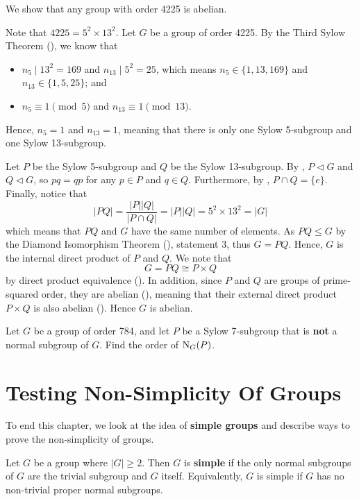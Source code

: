 \begin{example}
    We show that any group with order 4225 is abelian.

    Note that $4225 = 5^2 \times 13^2$. Let $G$ be a group of order 4225. By the Third Sylow Theorem (), we know that
    \begin{itemize}
        \item $n_5 \mid 13^2 = 169$ and $n_{13} \mid 5^2 = 25$, which means $n_5 \in \{1, 13, 169\}$ and $n_{13} \in \{1, 5, 25\}$; and
        \item $n_5 \equiv 1 \pmod 5$ and $n_{13} \equiv 1 \pmod{13}$.
    \end{itemize}
    Hence, $n_5 = 1$ and $n_{13} = 1$, meaning that there is only one Sylow 5-subgroup and one Sylow 13-subgroup.

    Let $P$ be the Sylow 5-subgroup and $Q$ be the Sylow 13-subgroup. By , $P \lhd G$ and $Q \lhd G$, so $pq = qp$ for any $p \in P$ and $q \in Q$. Furthermore, by , $P \cap Q = \{e\}$. Finally, notice that
    \[
        |PQ| = \frac{|P||Q|}{|P\cap Q|} = |P||Q| = 5^2\times13^2 = |G|
    \]
    which means that $PQ$ and $G$ have the same number of elements. As $PQ \leq G$ by the Diamond Isomorphism Theorem (), statement 3, thus $G = PQ$. Hence, $G$ is the internal direct product of $P$ and $Q$. We note that
    \[
        G = PQ \cong P\times Q
    \]
    by direct product equivalence (). In addition, since $P$ and $Q$ are groups of prime-squared order, they are abelian (), meaning that their external direct product $P\times Q$ is also abelian (). Hence $G$ is abelian.
\end{example}

\begin{exercise}
    Let $G$ be a group of order 784, and let $P$ be a Sylow 7-subgroup that is \textbf{not} a normal subgroup of $G$. Find the order of $\mathrm{N}_{G}(P)$.
\end{exercise}

\section{Testing Non-Simplicity Of Groups}
To end this chapter, we look at the idea of \textbf{simple groups} and describe ways to prove the non-simplicity of groups.
\begin{definition}
    Let $G$ be a group where $|G| \geq 2$. Then $G$ is \textbf{simple} if the only normal subgroups of $G$ are the trivial subgroup and $G$ itself. Equivalently, $G$ is simple if $G$ has no non-trivial proper normal subgroups.
\end{definition}

